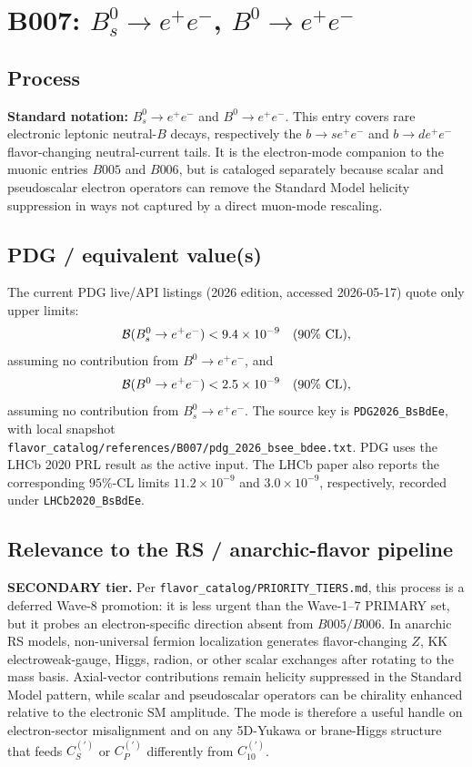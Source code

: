 
\section{B007: \(B_s^0\to e^+e^-\), \(B^0\to e^+e^-\)}

\subsection*{Process}
\textbf{Standard notation:} \(B_s^0\to e^+e^-\) and \(B^0\to e^+e^-\).
This entry covers rare electronic leptonic neutral-\(B\) decays,
respectively the \(b\to s e^+e^-\) and \(b\to d e^+e^-\) flavor-changing
neutral-current tails.  It is the electron-mode companion to the muonic
entries \(B005\) and \(B006\), but is cataloged separately because scalar and
pseudoscalar electron operators can remove the Standard Model helicity
suppression in ways not captured by a direct muon-mode rescaling.

\subsection*{PDG / equivalent value(s)}
The current PDG live/API listings (2026 edition, accessed 2026-05-17)
quote only upper limits:
\[
  {\cal B}(B_s^0\to e^+e^-) < 9.4\times 10^{-9}
  \quad(90\%\ {\rm CL}),
\]
assuming no contribution from \(B^0\to e^+e^-\), and
\[
  {\cal B}(B^0\to e^+e^-) < 2.5\times 10^{-9}
  \quad(90\%\ {\rm CL}),
\]
assuming no contribution from \(B_s^0\to e^+e^-\).  The source key is
\texttt{PDG2026\_BsBdEe}, with local snapshot
\texttt{flavor\_catalog/references/B007/pdg\_2026\_bsee\_bdee.txt}.  PDG uses
the LHCb 2020 PRL result as the active input.  The LHCb paper also reports the
corresponding \(95\%\)-CL limits \(11.2\times10^{-9}\) and \(3.0\times10^{-9}\),
respectively, recorded under \texttt{LHCb2020\_BsBdEe}.

\subsection*{Relevance to the RS / anarchic-flavor pipeline}
\textbf{SECONDARY tier.}  Per \texttt{flavor\_catalog/PRIORITY\_TIERS.md},
this process is a deferred Wave-8 promotion: it is less urgent than the
Wave-1--7 PRIMARY set, but it probes an electron-specific direction absent
from \(B005/B006\).  In anarchic RS models, non-universal fermion localization
generates flavor-changing \(Z\), KK electroweak-gauge, Higgs, radion, or other
scalar exchanges after rotating to the mass basis.  Axial-vector contributions
remain helicity suppressed in the Standard Model pattern, while scalar and
pseudoscalar operators can be chirality enhanced relative to the electronic SM
amplitude.  The mode is therefore a useful handle on electron-sector
misalignment and on any 5D-Yukawa or brane-Higgs structure that feeds
\(C_S^{(\prime)}\) or \(C_P^{(\prime)}\) differently from \(C_{10}^{(\prime)}\).

